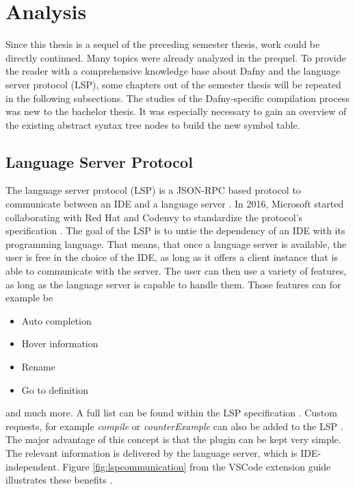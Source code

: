 \section{Analysis}
\label{section:analysis}
Since this thesis is a sequel of the preceding semester thesis, work could be directly continued.
Many topics were already analyzed in the prequel.
To provide the reader with a comprehensive knowledge base about Dafny and the language server protocol (LSP), some chapters out of the semester thesis will be repeated in the following subsections.
The studies of the Dafny-specific compilation process was new to the bachelor thesis.
It was especially necessary to gain an overview of the existing abstract syntax tree nodes to build the new symbol table.


\subsection{Language Server Protocol}
\label{section:analysis:lsp}
The language server protocol (LSP) is a JSON-RPC based protocol to communicate between an IDE and a language server \cite{lspWiki}.
In 2016, Microsoft started collaborating with Red Hat and Codenvy to standardize the protocol’s specification \cite{lspWiki}.
The goal of the LSP is to untie the dependency of an IDE with its programming language.
That means, that once a language server is available, the user is free in the choice of the IDE, as long as it offers a client instance that is able to communicate with the server.
The user can then use a variety of features, as long as the language server is capable to handle them.
Those features can for example be
\begin{itemize}
    \item Auto completion
    \item Hover information
    \item Rename
    \item Go to definition
\end{itemize}
and much more. A full list can be found within the LSP specification \cite{lspspec}.
Custom requests, for example \textit{compile} or \textit{counterExample} can also be added to the LSP \cite{lspWiki}.
The major advantage of this concept is that the plugin can be kept very simple.
The relevant information is delivered by the language server, which is IDE-independent.
Figure \ref{fig:lspcommunication} from the VSCode extension guide illustrates these benefits \cite{lspextensionguide}.

